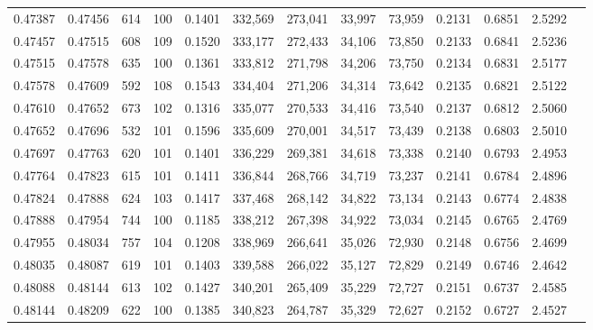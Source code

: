 \begin{tabular}{rrrrrrrrrrrrr}
0.47387 & 0.47456 &   614 & 100 &                                     0.1401 & 332,569 & 273,041 &  33,997 &  73,959 & 0.2131 & 0.6851 & 2.5292 \\
0.47457 & 0.47515 &   608 & 109 &                                     0.1520 & 333,177 & 272,433 &  34,106 &  73,850 & 0.2133 & 0.6841 & 2.5236 \\
0.47515 & 0.47578 &   635 & 100 &                                     0.1361 & 333,812 & 271,798 &  34,206 &  73,750 & 0.2134 & 0.6831 & 2.5177 \\
0.47578 & 0.47609 &   592 & 108 &                                     0.1543 & 334,404 & 271,206 &  34,314 &  73,642 & 0.2135 & 0.6821 & 2.5122 \\
0.47610 & 0.47652 &   673 & 102 &                                     0.1316 & 335,077 & 270,533 &  34,416 &  73,540 & 0.2137 & 0.6812 & 2.5060 \\
0.47652 & 0.47696 &   532 & 101 &                                     0.1596 & 335,609 & 270,001 &  34,517 &  73,439 & 0.2138 & 0.6803 & 2.5010 \\
0.47697 & 0.47763 &   620 & 101 &                                     0.1401 & 336,229 & 269,381 &  34,618 &  73,338 & 0.2140 & 0.6793 & 2.4953 \\
0.47764 & 0.47823 &   615 & 101 &                                     0.1411 & 336,844 & 268,766 &  34,719 &  73,237 & 0.2141 & 0.6784 & 2.4896 \\
0.47824 & 0.47888 &   624 & 103 &                                     0.1417 & 337,468 & 268,142 &  34,822 &  73,134 & 0.2143 & 0.6774 & 2.4838 \\
0.47888 & 0.47954 &   744 & 100 &                                     0.1185 & 338,212 & 267,398 &  34,922 &  73,034 & 0.2145 & 0.6765 & 2.4769 \\
0.47955 & 0.48034 &   757 & 104 &                                     0.1208 & 338,969 & 266,641 &  35,026 &  72,930 & 0.2148 & 0.6756 & 2.4699 \\
0.48035 & 0.48087 &   619 & 101 &                                     0.1403 & 339,588 & 266,022 &  35,127 &  72,829 & 0.2149 & 0.6746 & 2.4642 \\
0.48088 & 0.48144 &   613 & 102 &                                     0.1427 & 340,201 & 265,409 &  35,229 &  72,727 & 0.2151 & 0.6737 & 2.4585 \\
0.48144 & 0.48209 &   622 & 100 &                                     0.1385 & 340,823 & 264,787 &  35,329 &  72,627 & 0.2152 & 0.6727 & 2.4527 \\

\end{tabular}

